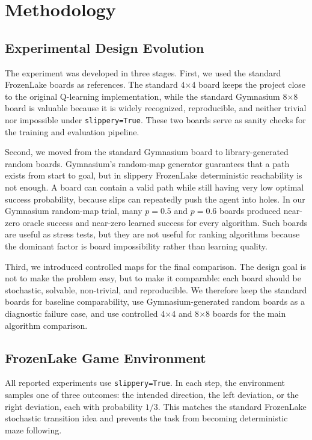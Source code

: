 \documentclass[10pt]{article}
\begin{document}
\section{Methodology}
\subsection{Experimental Design Evolution}
The experiment was developed in three stages. First, we used the standard FrozenLake boards as references. The standard 4$\times$4 board keeps the project close to the original Q-learning implementation, while the standard Gymnasium 8$\times$8 board is valuable because it is widely recognized, reproducible, and neither trivial nor impossible under \texttt{slippery=True}. These two boards serve as sanity checks for the training and evaluation pipeline.

Second, we moved from the standard Gymnasium board to library-generated random boards. Gymnasium's random-map generator guarantees that a path exists from start to goal, but in slippery FrozenLake deterministic reachability is not enough. A board can contain a valid path while still having very low optimal success probability, because slips can repeatedly push the agent into holes. In our Gymnasium random-map trial, many $p=0.5$ and $p=0.6$ boards produced near-zero oracle success and near-zero learned success for every algorithm. Such boards are useful as stress tests, but they are not useful for ranking algorithms because the dominant factor is board impossibility rather than learning quality.

Third, we introduced controlled maps for the final comparison. The design goal is not to make the problem easy, but to make it comparable: each board should be stochastic, solvable, non-trivial, and reproducible. We therefore keep the standard boards for baseline comparability, use Gymnasium-generated random boards as a diagnostic failure case, and use controlled 4$\times$4 and 8$\times$8 boards for the main algorithm comparison.

\subsection{FrozenLake Game Environment}
All reported experiments use \texttt{slippery=True}. In each step, the environment samples one of three outcomes: the intended direction, the left deviation, or the right deviation, each with probability $1/3$. This matches the standard FrozenLake stochastic transition idea and prevents the task from becoming deterministic maze following.
\end{document}
